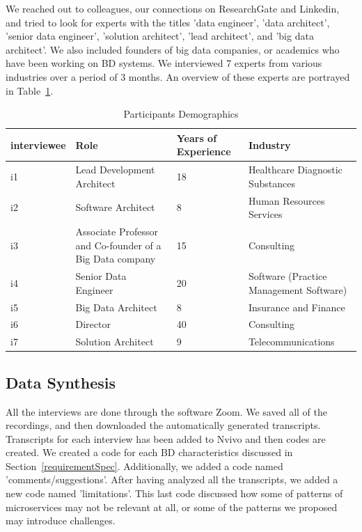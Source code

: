\documentclass{bmcart}
\begin{document}
We reached out to colleagues, our connections on ResearchGate and Linkedin, and tried to look for experts with the titles 'data engineer', 'data architect', 'senior data engineer', 'solution architect', 'lead architect', and 'big data architect'. We also included founders of big data companies, or academics who have been working on BD systems. We interviewed 7 experts from various industries over a period of 3 months. An overview of these experts are portrayed in Table~\ref{interviewees}. 


\begin{table}[h]
  \renewcommand{\arraystretch}{1.5}
  \caption[]{Participants Demographics}
  \begin{tabular}{|p{1.4cm}|p{4cm}|p{1.5cm}|p{2.5cm}|}
      \hline
      interviewee & Role & Years of Experience  & Industry \\  

      \hline
      i1 & Lead Development Architect & 18 &  Healthcare Diagnostic Substances \\   
      \hline
      i2 & Software Architect & 8 &  Human Resources Services  \\   
      \hline
      i3 & Associate Professor and Co-founder of a Big Data company & 15 &  Consulting \\   
      \hline
      i4 & Senior Data Engineer & 20 &  Software (Practice Management Software) \\   
      \hline
      i5 & Big Data Architect & 8 &  Insurance and Finance \\   
      \hline
      i6 & Director & 40 &  Consulting \\   
      \hline
      i7 & Solution Architect & 9 &  Telecommunications \\   
      \hline
      
  \end{tabular}
  \label{interviewees}
\end{table}


\subsection{Data Synthesis}

All the interviews are done through the software Zoom. We saved all of the recordings, and then downloaded the automatically generated transcripts. Transcripts for each interview has been added to Nvivo and then codes are created. We created a code for each BD characteristics discussed in Section~\ref{requirementSpec}. Additionally, we added a code named 'comments/suggestions'. After having analyzed all the transcripts, we added a new code named 'limitations'. This last code discussed how some of patterns of microservices may not be relevant at all, or some of the patterns we proposed may introduce challenges. 
\end{document}
